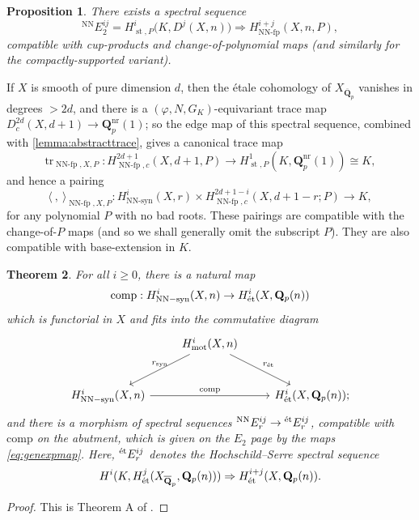 \documentclass[cjm]{ipart}
\theoremstyle{plain}
\newtheorem{theorem}{Theorem}[subsection]
\newtheorem{proposition}[theorem]{Proposition}
\theoremstyle{remark}
\DeclareMathOperator{\mot}{mot}
\DeclareMathOperator{\NNfp}{NN-fp}
\DeclareMathOperator{\NNsyn}{NN-syn}
\DeclareMathOperator{\st}{st}
\DeclareMathOperator{\syn}{syn}
\DeclareMathOperator{\tr}{tr}
\newcommand{\QQbar}{\overline{\QQ}}
\newcommand{\QQ}{\mathbf{Q}}
\newcommand{\Qp}{\QQ_p}
\newcommand{\et}{\text{\textup{\'et}}}
\numberwithin{equation}{subsection}
\renewcommand{\ge}{\geqslant}
\begin{document}
  \begin{proposition}
   There exists a spectral sequence
   \begin{equation}
    \label{eq:NNsynSS}
    {}^{\mathrm{NN}}E_2^{ij}=H^i_{\st, P}\Big(K, D^j(X, n)\Big) \Rightarrow H^{i+j}_{\NNfp}(X, n, P),
   \end{equation}
   compatible with cup-products and change-of-polynomial maps (and similarly for the compactly-sup\-port\-ed variant).
  \end{proposition}

  If $X$ is smooth of pure dimension $d$, then the \'etale cohomology of $X_{\QQbar_p}$ vanishes in degrees $> 2d$, and there is a $(\varphi, N, G_K)$-equivariant trace map $D^{2d}_c(X, d+1) \to \Qp^{\mathrm{nr}}(1)$; so the edge map of this spectral sequence, combined with \cref{lemma:abstracttrace}, gives a canonical trace map
  \begin{equation}\label{eq:NNtrace}
   \tr_{\NNfp, X, P}:  H^{2d+1}_{\NNfp, c}(X, d+1, P) \to H^1_{\st, P}(K, \Qp^{\mathrm{nr}}(1))\cong  K, \
  \end{equation}
  and hence a pairing
  \[
   \langle\ , \ \rangle_{\NNfp, X, P}: H^i_{\NNsyn}(X, r) \times H^{2d+1-i}_{\NNfp, c}(X, d+1-r; P) \to K,
  \]
  for any polynomial $P$ with no bad roots. These pairings are compatible with the change-of-$P$ maps (and so we shall generally omit the subscript $P$). They are also compatible with base-extension in $K$.

  \begin{theorem}
   \label{thm:NNetcomp}
   For all $i \ge 0$, there is a natural map
   \[ \mathrm{comp}: H^i_{\NNsyn}(X,n)\to H^i_{\et}(X,\Qp(n))\]
   which is functorial in $X$ and fits into the commutative diagram
   \[
    \begin{tikzcd}[row sep=large]
     & H^i_{\mot}(X,n) \ar[rd, "r_{\et}"] \ar[ld, "r_{\syn}" above] & \\
     H^i_{\NNsyn}(X,n) \ar[rr, "\operatorname{comp}"] & & H^i_{\et}(X,\Qp(n));
    \end{tikzcd}
   \]
   and there is a morphism of spectral sequences ${}^{\mathrm{NN}}E_r^{ij}\rightarrow {}^{\et}E_r^{ij}$, compatible with $\mathrm{comp}$ on the abutment, which is given on the $E_2$ page by the maps \eqref{eq:genexpmap}. Here, ${}^{\et}E_r^{ij}$ denotes the Hochschild--Serre spectral sequence
   \[ H^i(K, H^j_{\et}(X_{\QQbar_p},\Qp(n)))\Rightarrow H^{i+j}_{\et}(X,\Qp(n)).\]
  \end{theorem}

  \begin{proof}
   This is Theorem A of \cite{nekovarniziol16}.
  \end{proof}
\end{document}
